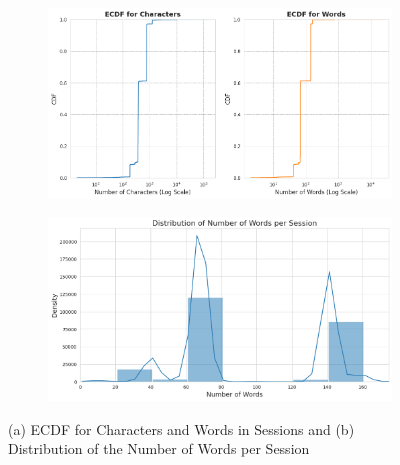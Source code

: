         \begin{figure}[h]
            \centering
            \begin{subfigure}[b]{0.45\textwidth}
                \centering
                \includegraphics[width=\textwidth]{../figures/plots/section1/ecdf_for_characters_and_for_words.png}
                \label{fig:ecdf_sessions}
            \end{subfigure}
            \hfill
            \begin{subfigure}[b]{0.52\textwidth}
                \centering
                \includegraphics[width=\textwidth]{../figures/plots/section1/distribution_of_number_of_words_per_session_limited.png}
                \label{fig:word_distribution}
            \end{subfigure}
            \vspace{-0.5cm}
            \caption{(a) ECDF for Characters and Words in Sessions and (b) Distribution of the Number of Words per Session}
            \label{fig:ecfd-and-distribution-number-words}
        \end{figure}


